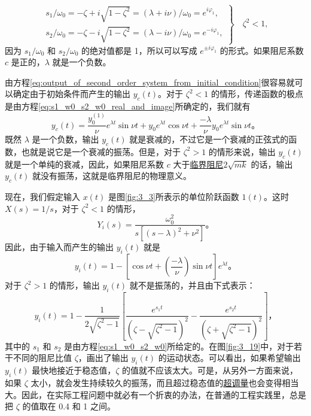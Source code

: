 \begin{equation}\label{eq:s1_w0_s2_w0_real_and_image}
\left.
\begin{array}{l}
s_1/\omega_0 = -\zeta + i\sqrt{1-\zeta^2} = (\lambda+i\nu)/\omega_0 = e^{i\varphi_1},\\
s_2/\omega_0 = -\zeta - i\sqrt{1-\zeta^2} = (\lambda-i\nu)/\omega_0 = e^{-i\varphi_1},
\end{array}
\right\}
 \quad \zeta^2 < 1,
\end{equation}
因为 $s_1/\omega_0$ 和 $s_2/\omega_0$ 的绝对值都是 1，所以可以写成 $e^{\pm i\varphi_1}$ 的形式。如果阻尼系数 $c$ 是正的，$\lambda$ 就是一个负数。

由方程\eqref{eq:output_of_second_order_system_from_initial_condition}很容易就可以确定由于初始条件而产生的输出 $y_c(t)$。对于 $\zeta^2<1$ 的情形，传递函数的极点是由方程\eqref{eq:s1_w0_s2_w0_real_and_image}所确定的，我们就有
\begin{equation}
y_c(t) = \frac{y^{(1)}_0}{\nu} e^{\lambda t} \sin \nu t + y_0 e^{\lambda t} \cos \nu t + \frac{-\lambda}{\nu} y_0 e^{\lambda t} \sin \nu t。
\end{equation}
既然 $\lambda$ 是一个负数，输出 $y_c(t)$ 就是衰减的，不过它是一个衰减的正弦式的函数，也就是说它是一个衰减的振荡。但是，对于 $\zeta^2>1$ 的情形来说，输出 $y_c(t)$ 就是一个单纯的衰减，因此，如果阻尼系数 $c$ 大于\underline{临界阻尼}$2\sqrt{mk}$ 的话，输出 $y_c(t)$ 就没有振荡，这就是临界阻尼的物理意义。

现在，我们假定输入 $x(t)$ 是图\ref{fig:3_3}所表示的单位阶跃函数 $1(t)$。这时 $X(s)=1/s$，对于 $\zeta^2<1$ 的情形，
\begin{equation*}
Y_i(s) = \frac{\omega_0^2}{s[(s-\lambda)^2+\nu^2]}。
\end{equation*}
因此，由于输入而产生的输出 $y_i(t)$ 就是
\begin{equation}
y_i(t) = 1 - \left[ \cos \nu t + \left( \frac{-\lambda}{\nu} \right) \sin \nu t \right] e^{\lambda t}。
\end{equation}
对于 $\zeta^2>1$ 的情形，输出 $y_i(t)$ 就不是振荡的，并且由下式表示：
\begin{equation}
y_i(t) = 1 - \frac{1}{2\sqrt{\zeta^2-1}} \left[ \frac{e^{s_1 t}}{(\zeta-\sqrt{\zeta^2-1})^2} - \frac{e^{s_2 t}}{(\zeta+\sqrt{\zeta^2-1})^2} \right]，
\end{equation}
其中的 $s_1$ 和 $s_2$ 是由方程\eqref{eq:s1_w0_s2_w0}所给定的。在图\ref{fig:3_19}中，对于若干不同的阻尼比值 $\zeta$，画出了输出 $y_i(t)$ 的运动状态。可以看出，如果希望输出 $y_i(t)$ 最快地接近于稳态值，$\zeta$ 的值就不应该太大。可是，从另外一方面来说，如果 $\zeta$ 太小，就会发生持续较久的振荡，而且超过稳态值的\underline{超调量}也会变得相当大。因此，在实际工程问题中就必有一个折衷的办法，在普通的工程实践里，总是把 $\zeta$ 的值取在 0.4 和 1 之间。

